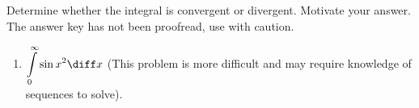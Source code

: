 Determine whether the integral is convergent or divergent. Motivate your answer. The answer key has not been proofread, use with caution.

\begin{multicols}{2}
\begin{enumerate}
\item $\displaystyle \int \limits_{0}^{\infty}\sin x^2\diff x$ (This problem is more difficult and may require knowledge of sequences to solve).

\end{enumerate}
\end{multicols}
